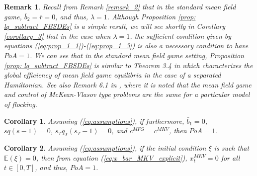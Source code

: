 \documentclass[11pt]{article}
\newtheorem{remark}{Remark}
\newtheorem{corollary}{Corollary}
\begin{document}
\begin{remark}
	Recall from Remark \ref{remark_2} that in the standard mean field game, $\bar{b}_2=\bar{r}=0$, and thus, $\lambda=1$. Although Proposition \ref{prop: lq_subtract_FBSDEs} is a simple result, we will see shortly in Corollary \ref{corollary_3} that in the case when $\lambda=1$, the sufficient condition given by equations (\ref{eq:prop_1_1})-(\ref{eq:prop_1_3}) is also a necessary condition to have $PoA=1$. We can see that in the standard mean field game setting, Proposition \ref{prop: lq_subtract_FBSDEs} is similar to Theorem 3.4 in \cite{pierre_poa} which characterizes the global efficiency of mean field game equilibria in the case of a separated Hamiltonian. See also Remark 6.1 in \cite{nourian2013nash}, where it is noted that the mean field game and control of McKean-Vlasov type problems are the same for a particular model of flocking.
\end{remark}


\begin{corollary}
	Assuming (\ref{eq:assumptions}), if furthermore, $\bar{b}_1=0$, $s\bar{q}(s-1)=0$, $s_T\bar{q}_T(s_T-1)=0$, and $c^{MFG} = c^{MKV}$,
	then $PoA=1$.
	\label{corollary_1}
\end{corollary}

\begin{corollary}
	Assuming (\ref{eq:assumptions}), if the initial condition $\xi$ is such that $\mathbb{E}(\xi)=0$, then from equation (\ref{eq:x_bar_MKV_explicit}), $x^{MKV}_t =0$ for all $t\in[0,T]$, and thus, $PoA=1$.
	\label{corollary_2}
\end{corollary}
\end{document}

